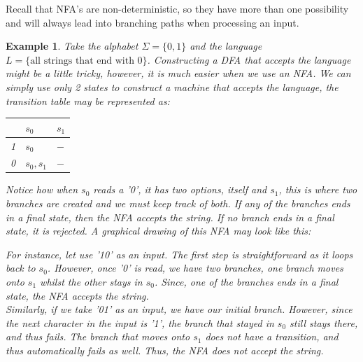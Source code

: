 \documentclass[12pt, letterpaper]{article}
\newtheorem{ex}[thm]{Example}
\begin{document}
Recall that NFA's are non-deterministic, so they have more than one possibility and will always lead into branching paths when processing an input.

\begin{ex}
Take the alphabet $\Sigma = \{ 0,1 \}$ and the language $L = \{ \text{all strings that end with 0} \}$. Constructing a DFA that accepts the language might be a little tricky, however, it is much easier when we use an NFA. We can simply use only 2 states to construct a machine that accepts the language, the transition table may be represented as:
\begin{table}[!h]
\centering
\begin{tabular}{l|ll}
  & $s_0$      & $s_1$ \\ \hline
1 & $s_0$      & $-$ \\
0 & $s_0, s_1$ & $-$
\end{tabular}
\end{table}
Notice how when $s_0$ reads a '0', it has two options, itself and $s_1$, this is where two branches are created and we must keep track of both. If any of the branches ends in a final state, then the NFA accepts the string. If no branch ends in a final state, it is rejected. A graphical drawing of this NFA may look like this:
\begin{center}
\end{center}
For instance, let use '10' as an input. The first step is straightforward as it loops back to $s_0$. However, once '0' is read, we have two branches, one branch moves onto $s_1$ whilst the other stays in $s_0$. Since, one of the branches ends in a final state, the NFA accepts the string.\\

Similarly, if we take '01' as an input, we have our initial branch. However, since the next character in the input is '1', the branch that stayed in $s_0$ still stays there, and thus fails. The branch that moves onto $s_1$ does not have a transition, and thus automatically fails as well. Thus, the NFA does not accept the string.
\end{ex}
\end{document}
